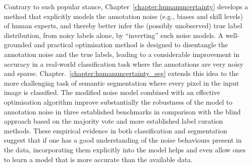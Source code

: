 Contrary to such popular stance, Chapter~\ref{chapter:humanuncertainty} develops a method that explicitly models the annotation noise  (e.g., biases and skill levels) of human experts, and thereby better infer the (possibly unobserved) true label distribution, from noisy labels alone, by ``inverting'' such noise models. A well-grounded and practical optimisation method is designed to disentangle the annotation noise and the true labels, leading to a considerable improvement in accuracy in a real-world classification task where the annotations are very noisy and sparse. Chapter.~\ref{chapter:humanuncertainty_seg} extends this idea to the more challenging task of semantic segmentation where every pixel in the input image is classified. The modified noise model combined with an effective optimisation algorithm improve substantially the robustness of the model to annotation noise in three established benchmarks in comparison with the blind approach based on the majority vote and more established label curation methods. These empirical evidence in both classification and segmentation suggest that if one has a good understanding of the noise behaviours present in the data, incorporating them explicitly into the model helps and even allow ones to learn a model that is more accurate than the available data. 


